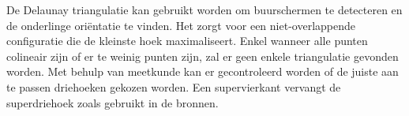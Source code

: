 De Delaunay triangulatie kan gebruikt worden om buurschermen te detecteren en de onderlinge oriëntatie te vinden. Het zorgt voor een niet-overlappende configuratie die de kleinste hoek maximaliseert. Enkel wanneer alle punten colineair zijn of er te weinig punten zijn, zal er geen enkele triangulatie gevonden worden. Met behulp van meetkunde kan er gecontroleerd worden of de juiste aan te passen driehoeken gekozen worden. Een supervierkant vervangt de superdriehoek zoals gebruikt in de bronnen. 